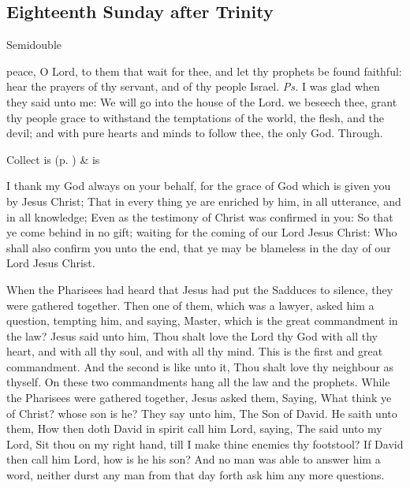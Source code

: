 \clearpage
\subsection{Eighteenth Sunday after Trinity}
\begin{inhead}
{Semidouble}
\end{inhead}


\introit
{} peace, O Lord, to them that wait for thee, and let thy prophets be found faithful: hear the prayers of thy servant, and of thy people Israel. \textit{Ps.} I was glad when they said unto me: We will go into the house of the Lord.
\collect
{} we beseech thee, grant thy people grace to withstand the temptations of the world, the flesh, and the devil; and with pure hearts and minds to follow thee, the only God. Through.
\begin{rubric}
     Collect is  (p. \pageref{SPSaints}) \&  is 
\end{rubric}

 I thank my God always on your behalf, for the grace of God which is given you by Jesus Christ; That in every thing ye are enriched by him, in all utterance, and in all knowledge; Even as the testimony of Christ was confirmed in you: So that ye come behind in no gift; waiting for the coming of our Lord Jesus Christ: Who shall also confirm you unto the end, that ye may be blameless in the day of our Lord Jesus Christ.


 When the Pharisees had heard that Jesus had put the Sadduces to silence, they were gathered together. Then one of them, which was a lawyer, asked him a question, tempting him, and saying, Master, which is the great commandment in the law? Jesus said unto him, Thou shalt love the Lord thy God with all thy heart, and with all thy soul, and with all thy mind. This is the first and great commandment. And the second is like unto it, Thou shalt love thy neighbour as thyself. On these two commandments hang all the law and the prophets. While the Pharisees were gathered together, Jesus asked them, Saying, What think ye of Christ? whose son is he? They say unto him, The Son of David. He saith unto them, How then doth David in spirit call him Lord, saying, The  said unto my Lord, Sit thou on my right hand, till I make thine enemies thy footstool? If David then call him Lord, how is he his son? And no man was able to answer him a word, neither durst any man from that day forth ask him any more questions.

